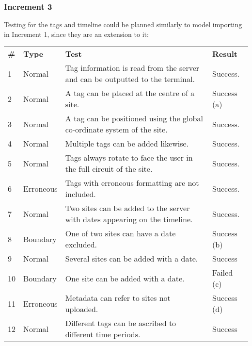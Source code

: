 \documentclass{article}
\begin{document}
\subsubsection{Increment 3}
Testing for the tags and timeline could be planned similarly to model importing in Increment 1, since they are an extension to it:
\begin{table}[H]
\begin{tabular}{llll}
\textbf{\#} & \textbf{Type} & \textbf{Test}                                                              & \textbf{Result}                       \\
1 & Normal   & Tag information is read from the server and can be outputted to the terminal. & Success.                                       \\
2 & Normal   & A tag can be placed at the centre of a site.                                  & Success (a) \\
3          & Normal        & A tag can be positioned using the global co-ordinate system of the site.   & Success.                              \\
4          & Normal        & Multiple tags can be added likewise.                                       & Success.                              \\
5          & Normal        & Tags always rotate to face the user in the full circuit of the site.       & Success.                              \\
6          & Erroneous     & Tags with erroneous formatting are not included.                           & Success.                              \\
7          & Normal        & Two sites can be added to the server with dates appearing on the timeline. & Success.                              \\
8 & Boundary & One of two sites can have a date excluded.                                    & Success (b)     \\
9          & Normal        & Several sites can be added with a date.                                    & Success                               \\
10         & Boundary      & One site can be added with a date.                                         & Failed (c)                               \\
11         & Erroneous     & Metadata can refer to sites not uploaded.                                  & Success (d) \\
12         & Normal        & Different tags can be ascribed to different time periods.                  & Success                               \\

\end{tabular}
\end{table}
\end{document}
